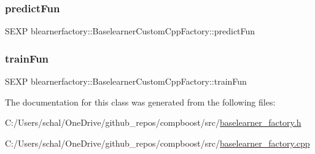 \subsubsection{\texorpdfstring{predict\+Fun}{predictFun}}
{\footnotesize\ttfamily S\+E\+XP blearnerfactory\+::\+Baselearner\+Custom\+Cpp\+Factory\+::predict\+Fun\hspace{0.3cm}{\ttfamily [private]}}

\mbox{\label{classblearnerfactory_1_1_baselearner_custom_cpp_factory_a8b36c04fdd1532ee53a1970f35641c05}} 
\subsubsection{\texorpdfstring{train\+Fun}{trainFun}}
{\footnotesize\ttfamily S\+E\+XP blearnerfactory\+::\+Baselearner\+Custom\+Cpp\+Factory\+::train\+Fun\hspace{0.3cm}{\ttfamily [private]}}



The documentation for this class was generated from the following files\+:\begin{DoxyCompactItemize}
\item 
C\+:/\+Users/schal/\+One\+Drive/github\+\_\+repos/compboost/src/\mbox{\hyperlink{baselearner__factory_8h}{baselearner\+\_\+factory.\+h}}\item 
C\+:/\+Users/schal/\+One\+Drive/github\+\_\+repos/compboost/src/\mbox{\hyperlink{baselearner__factory_8cpp}{baselearner\+\_\+factory.\+cpp}}\end{DoxyCompactItemize}
